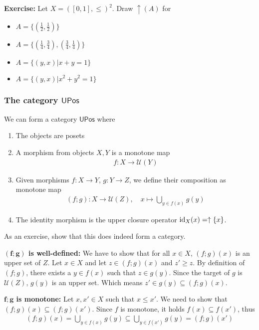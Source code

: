 \textbf{Exercise:} Let $X = {([0,1],\leq)}^{2}$. Draw $\uparrow(A)$ for
\begin{itemize}
  \item $A = \{(\tfrac{1}{2},\tfrac{1}{2})\}$
  \item $A = \{(\tfrac{1}{4},\tfrac{3}{4}),(\tfrac{3}{4},\tfrac{1}{4})\}$
  \item $A = \{(y,x) \big\vert x + y = 1\}$
  \item $A = \{(y,x) \big\vert x^{2} + y^{2} = 1\}$
\end{itemize}

\subsubsection{The category $\textsf{UPos}$}

We can form a category $\textsf{UPos}$ where
\begin{enumerate}
  \item The objects are posets
  \item A morphism from objects $X,Y$ is a monotone map
    \begin{align*}
      f: X \to  \mathcal{U}(Y)
    \end{align*}
  \item Given morphisms $f: X \to Y$, $g: Y \to Z$, we define their composition as monotone map
    \begin{align*}
      (f;g): X \to \mathcal{U}(Z)
      ,\quad
      x \mapsto \bigcup_{y \in f(x)} g(y)
    \end{align*}
  \item The identity morphism is the upper closure operator $\operatorname{id}_X(x) = \uparrow \{x\}$.
\end{enumerate}
As an exercise, show that this does indeed form a category.

\textbf{$\bm{(f;g)}$ is well-defined:} 
We have to show that for all $x \in X$, $(f;g)(x)$ is an upper set of $Z$.
Let $x \in X$ and let $z \in (f;g)(x)$ and $z' \geq z$. By definition of $(f;g)$, there exists a $y \in f(x)$ such that $z \in g(y)$.
Since the target of $g$ is $\mathcal{U}(Z)$, $g(y)$ is an upper set. Which means $z' \in g(y) \subseteq (f;g)(x)$.

\textbf{$\bm{f;g}$ is monotone:} Let $x,x' \in X$ such that $x \leq x'$.
We need to show that $(f;g)(x) \subseteq (f;g)(x')$.
Since $f$ is monotone, it holds $f(x) \subseteq f(x')$, thus 
\begin{align*}
  (f;g)(x) =
  \bigcup_{y \in f(x)} g(y) \subseteq \bigcup_{y \in f(x')} g(y)
  = (f;g)(x')
\end{align*}

